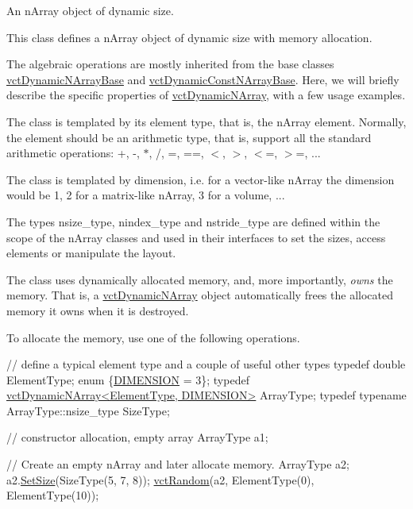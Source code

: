 An n\+Array object of dynamic size. 

This class defines a n\+Array object of dynamic size with memory allocation.

The algebraic operations are mostly inherited from the base classes \hyperlink{classvct_dynamic_n_array_base}{vct\+Dynamic\+N\+Array\+Base} and \hyperlink{classvct_dynamic_const_n_array_base}{vct\+Dynamic\+Const\+N\+Array\+Base}. Here, we will briefly describe the specific properties of \hyperlink{classvct_dynamic_n_array}{vct\+Dynamic\+N\+Array}, with a few usage examples.


\begin{DoxyEnumerate}
\item The class is templated by its element type, that is, the n\+Array element. Normally, the element should be an arithmetic type, that is, support all the standard arithmetic operations\+: +, -\/, $\ast$, /, =, ==, $<$, $>$, $<$=, $>$=, ... 
\item The class is templated by dimension, i.\+e. for a vector-\/like n\+Array the dimension would be 1, 2 for a matrix-\/like n\+Array, 3 for a volume, ... 
\item The types {\ttfamily nsize\+\_\+type}, {\ttfamily nindex\+\_\+type} and {\ttfamily nstride\+\_\+type} are defined within the scope of the n\+Array classes and used in their interfaces to set the sizes, access elements or manipulate the layout. 
\item The class uses dynamically allocated memory, and, more importantly, {\itshape owns} the memory. That is, a \hyperlink{classvct_dynamic_n_array}{vct\+Dynamic\+N\+Array} object automatically frees the allocated memory it owns when it is destroyed. 
\item To allocate the memory, use one of the following operations. 
\begin{DoxyCode}
\textcolor{comment}{// define a typical element type and a couple of useful other types}
\textcolor{keyword}{typedef} \textcolor{keywordtype}{double} ElementType;
\textcolor{keyword}{enum} \{\hyperlink{classvct_dynamic_n_array_base_aa66532d28588bdf26d08fb593db815d6abfcde386ec801b212d7c42d63a4f3837}{DIMENSION} = 3\};
\textcolor{keyword}{typedef} \hyperlink{classvct_dynamic_n_array}{vctDynamicNArray<ElementType, DIMENSION>} ArrayType;
\textcolor{keyword}{typedef} \textcolor{keyword}{typename} ArrayType::nsize\_type SizeType;

\textcolor{comment}{// constructor allocation, empty array}
ArrayType a1;

\textcolor{comment}{// Create an empty nArray and later allocate memory.}
ArrayType a2;
a2.\hyperlink{classvct_dynamic_n_array_a8f800ef9c9406b3fe6252348e3e30b95}{SetSize}(SizeType(5, 7, 8));
\hyperlink{group__cisst_vector_ga0d25660a2dc6ef9c093f6f6b2804d2d0}{vctRandom}(a2, ElementType(0), ElementType(10));


\end{DoxyCode}
\end{DoxyEnumerate}

